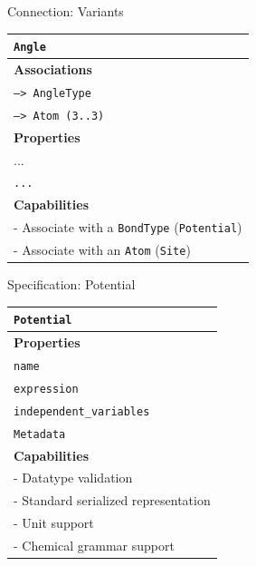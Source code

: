 \documentclass[xcolor=table]{beamer}
\begin{document}
\begin{frame}{Connection: Variants}
\begin{table}[ht]
    \centering
    \label{tab:ExampleConnections}

\begin{tabular}{|l|}
         \hline
         \rowcolor{gray!50}
         \texttt{Angle}  \\
         \hline
         \textbf{Associations} \\
         \hline
         \texttt{--> AngleType}\\
          \texttt{--> Atom (3..3)}\\

         \textbf{Properties}\\
         \hline
            ...\\
         \texttt{...}\\
         \hline
         \textbf{Capabilities}\\
         \hline
         - Associate with a \texttt{BondType} (\texttt{Potential})\\
         - Associate with an \texttt{Atom} (\texttt{Site})\\
        \hline
    \end{tabular}
\end{table}

\end{frame}

\begin{frame}{Specification: Potential}

\begin{table}[ht]
    \centering
    \begin{tabular}{|l|}
         \hline
         \rowcolor{gray!50}
         \texttt{Potential}  \\
         \hline
         \textbf{Properties}\\
         \hline
         \texttt{name} \\
         \texttt{expression} \\
         \texttt{independent\_variables}\\
         \texttt{Metadata}\\
         \hline
         \textbf{Capabilities}\\
         \hline
         - Datatype validation \\
         - Standard serialized representation \\
         - Unit support \\
         - Chemical grammar support \\
        \hline
    \end{tabular}
    \label{tab:PotSpec}
\end{table}
\end{frame}
\end{document}
